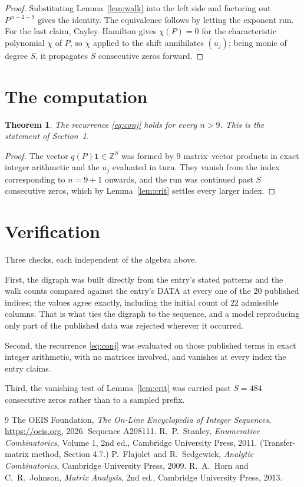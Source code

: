 \documentclass[11pt,a4paper]{article}
\theoremstyle{plain}
\newtheorem{theorem}{Theorem}
\theoremstyle{definition}
\begin{document}
\begin{proof}
Substituting Lemma~\ref{lem:walk} into the left side and factoring out
$P^{\,n-2-9}$ gives the identity. The equivalence follows by letting the exponent
run. For the last claim, Cayley--Hamilton gives $\chi(P)=0$ for the characteristic
polynomial $\chi$ of $P$, so $\chi$ applied to the shift annihilates $(u_j)$; being monic of
degree $S$, it propagates $S$ consecutive zeros forward.
\end{proof}

\section{The computation}

\begin{theorem}
The recurrence \eqref{eq:conj} holds for every $n>9$. This is the statement of
Section~1.
\end{theorem}

\begin{proof}
The vector $q(P)\mathbf{1}\in\mathbb{Z}^{S}$ was formed by $9$ matrix--vector
products in exact integer arithmetic and the $u_j$ evaluated in turn. They vanish from the
index corresponding to $n=9+1$ onwards, and the run was continued past $S$ consecutive
zeros, which by Lemma~\ref{lem:crit} settles every larger index.
\end{proof}

\section{Verification}

Three checks, each independent of the algebra above.

First, the digraph was built directly from the entry's stated patterns and the walk counts
compared against the entry's DATA at every one of the $20$ published indices; the
values agree exactly, including the initial count of $22$ admissible columns. That is
what ties the digraph to the sequence, and a model reproducing only part of the published
data was rejected wherever it occurred.

Second, the recurrence \eqref{eq:conj} was evaluated on those published terms in exact
integer arithmetic, with no matrices involved, and vanishes at every index the entry claims.

Third, the vanishing test of Lemma~\ref{lem:crit} was carried past $S=484$ consecutive
zeros rather than to a sampled prefix.

\begin{thebibliography}{9}
 The OEIS Foundation, \emph{The On-Line Encyclopedia of Integer
Sequences}, \url{https://oeis.org}, 2026. Sequence A208111.
 R.~P.~Stanley, \emph{Enumerative Combinatorics}, Volume 1, 2nd ed.,
Cambridge University Press, 2011. (Transfer-matrix method, Section 4.7.)
 P.~Flajolet and R.~Sedgewick, \emph{Analytic Combinatorics}, Cambridge
University Press, 2009.
 R.~A.~Horn and C.~R.~Johnson, \emph{Matrix Analysis}, 2nd ed., Cambridge
University Press, 2013.
\end{thebibliography}
\end{document}
